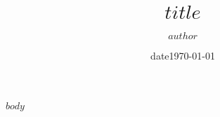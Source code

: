 \documentclass{garamond}
\title{$title$}
\author{$author$}
\date{date}
\date{\today}
\begin{document}
\maketitle

$body$



\end{document}

